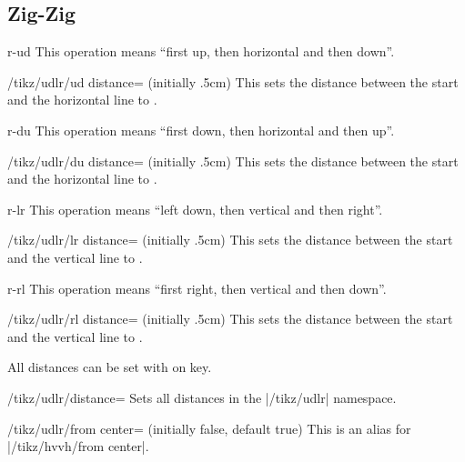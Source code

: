 \subsection{Zig-Zig}
\begin{pathoperation}{r-ud}{}
  This operation means ``first up, then horizontal and then down''.
  \begin{key}{/tikz/udlr/ud distance= (initially .5cm)}
    This sets the distance between the start and the horizontal line to .
  \end{key}
\end{pathoperation}
\begin{pathoperation}{r-du}{}
  This operation means ``first down, then horizontal and then up''.
  \begin{key}{/tikz/udlr/du distance= (initially .5cm)}
    This sets the distance between the start and the horizontal line to .
  \end{key}
\end{pathoperation}
\begin{pathoperation}{r-lr}{}
  This operation means ``left down, then vertical and then right''.
  \begin{key}{/tikz/udlr/lr distance= (initially .5cm)}
    This sets the distance between the start and the vertical line to .
  \end{key}
\end{pathoperation}
\begin{pathoperation}{r-rl}{}
  This operation means ``first right, then vertical and then down''.
  \begin{key}{/tikz/udlr/rl distance= (initially .5cm)}
    This sets the distance between the start and the vertical line to .
  \end{key}
\end{pathoperation}

All distances can be set with on key.
\begin{key}{/tikz/udlr/distance=}
  Sets all distances in the |/tikz/udlr| namespace.
\end{key}

\begin{key}{/tikz/udlr/from center= (initially false, default true)}
  This is an alias for |/tikz/hvvh/from center|.
\end{key}

